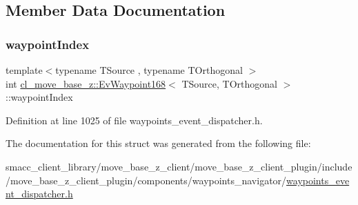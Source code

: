 \subsection{Member Data Documentation}
\mbox{\label{structcl__move__base__z_1_1EvWaypoint168_a6ce19cf3c9193349e940b39e2e9734bb}} 
\subsubsection{\texorpdfstring{waypoint\+Index}{waypointIndex}}
{\footnotesize\ttfamily template$<$typename T\+Source , typename T\+Orthogonal $>$ \\
int \hyperlink{structcl__move__base__z_1_1EvWaypoint168}{cl\+\_\+move\+\_\+base\+\_\+z\+::\+Ev\+Waypoint168}$<$ T\+Source, T\+Orthogonal $>$\+::waypoint\+Index}



Definition at line 1025 of file waypoints\+\_\+event\+\_\+dispatcher.\+h.



The documentation for this struct was generated from the following file\+:\begin{DoxyCompactItemize}
\item 
smacc\+\_\+client\+\_\+library/move\+\_\+base\+\_\+z\+\_\+client/move\+\_\+base\+\_\+z\+\_\+client\+\_\+plugin/include/move\+\_\+base\+\_\+z\+\_\+client\+\_\+plugin/components/waypoints\+\_\+navigator/\hyperlink{waypoints__event__dispatcher_8h}{waypoints\+\_\+event\+\_\+dispatcher.\+h}\end{DoxyCompactItemize}
